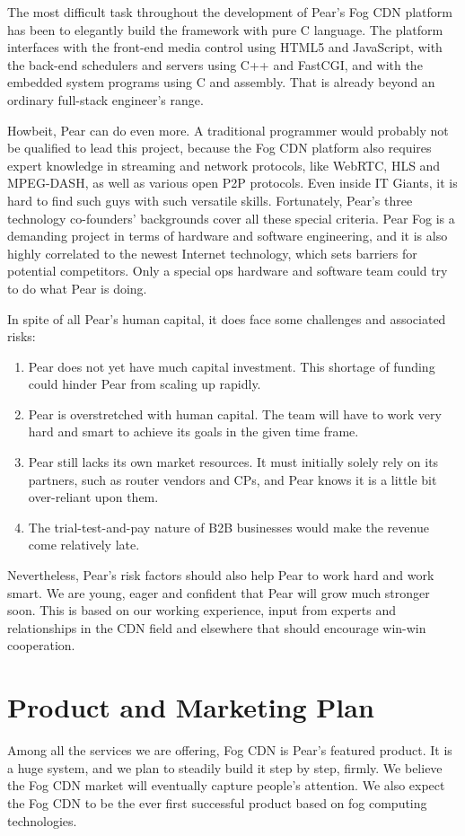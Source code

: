 The most difficult task throughout the development of Pear's Fog CDN platform has been to elegantly build the framework with pure C language. The platform interfaces with the front-end media control using HTML5 and JavaScript, with the back-end schedulers and servers using C++ and FastCGI, and with the embedded system programs using C and assembly. That is already beyond an ordinary full-stack engineer's range.

Howbeit, Pear can do even more. A traditional programmer would probably not be qualified to lead this project, because the Fog CDN platform also requires expert knowledge in streaming and network protocols, like WebRTC, HLS and MPEG-DASH, as well as various open P2P protocols. Even inside IT Giants, it is hard to find such guys with such versatile skills. Fortunately, Pear's three technology co-founders' backgrounds cover all these special criteria. Pear Fog is a demanding project in terms of hardware and software engineering, and it is also highly correlated to the newest Internet technology, which sets barriers for potential competitors. Only a special ops hardware and software team could try to do what Pear is doing.

In spite of all Pear's human capital, it does face some challenges and associated risks: 
\begin{enumerate}
	\item Pear does not yet have much capital investment. This shortage of funding could hinder Pear from scaling up rapidly. 
	\item Pear is overstretched with human capital. The team will have to work very hard and smart to achieve its goals in the given time frame.
	\item Pear still lacks its own market resources. It must initially solely rely on its partners, such as router vendors and CPs, and Pear knows it is a little bit over-reliant upon them. 
	\item The trial-test-and-pay nature of B2B businesses would make the revenue come relatively late. 
\end{enumerate}

Nevertheless, Pear's risk factors should also help Pear to work hard and work smart. We are young, eager and confident that Pear will grow much stronger soon. 
This is based on our working experience, input from experts and relationships in the CDN field and elsewhere that should encourage win-win cooperation.

\section{Product and Marketing Plan}
Among all the services we are offering, Fog CDN is Pear's featured product. It is a huge system, and we plan to steadily build it step by step, firmly. We believe the Fog CDN market will eventually capture people's attention. We also expect the Fog CDN to be the ever first successful product based on fog computing technologies. 

